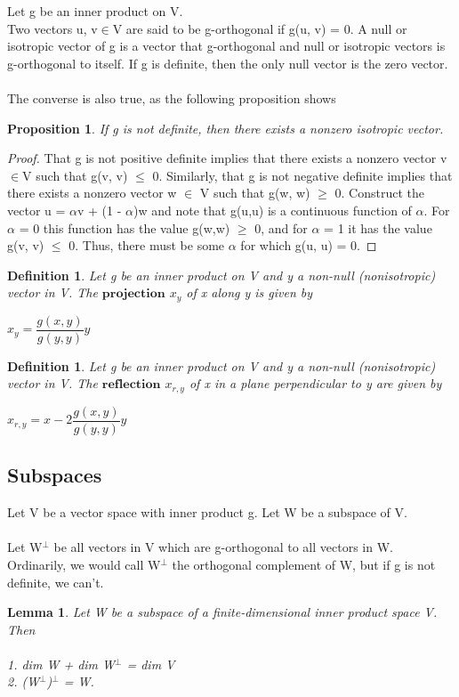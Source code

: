 \documentclass[12pt,a4paper]{article}
\newtheorem{lem}[thm]{Lemma}
\newtheorem{defn}[thm]{Definition}
\newtheorem{prop}{Proposition}
\begin{document}
Let g be an inner product on V. \\
Two vectors u, v$\in$V are said to be
g-orthogonal if g(u, v) = 0. A null or isotropic vector of g is a vector that
g-orthogonal and null or
isotropic vectors
is g-orthogonal to itself. If g is definite, then the only null vector is the zero
vector. \\\\The converse is also true, as the following proposition shows

\begin{prop}
If g is not definite, then there exists a nonzero
isotropic vector.
\end{prop}
\begin{proof}
That g is not positive definite implies that there exists a nonzero vector v$\in$V such that g(v, v) $\leq$ 0. Similarly, that g is not negative definite
implies that there exists a nonzero vector w $\in$ V such that g(w, w) $\geq$ 0. Construct the vector u = $\alpha$v + (1 - $\alpha$)w and note that g(u,u) is a continuous function of $\alpha$. For $\alpha$ = 0 this function has the value g(w,w) $\geq$ 0, and for $\alpha$ = 1 it has the value g(v, v) $\leq$ 0. Thus, there must be some $\alpha$ for which g(u, u) = 0.
\end{proof}
\begin{defn}
Let g be an inner product on V and y a non-null (nonisotropic) vector in V. The $\textbf{projection}$ $x_y$ of x along y is given by 
\begin{center}
$x_y = \dfrac{g(x,y)}{g(y,y)} y$
\end{center}
\end{defn}
\begin{defn}
Let g be an inner product on V and y a non-null (nonisotropic) vector in V. The $\textbf{reflection}$ $x_{r,y}$ of x in a plane perpendicular to y are given by 
\begin{center}
$x_{r,y} = x - 2 \dfrac{g(x,y)}{g(y,y)} y$
\end{center}
\end{defn}

\subsection{Subspaces}
Let V be a vector space with inner product g. Let W be a subspace of V.\\\\
Let W$^\perp$ be all vectors in V which are g-orthogonal to all vectors in W.
Ordinarily, we would call W$^\perp$ the orthogonal complement of W, but if g
is not definite, we can’t.
\begin{lem}
Let W be a subspace of a finite-dimensional inner product
space V. Then\\\\
1. dim W + dim W$^\perp$ = dim V\\
2. (W$^\perp$)$^\perp$ = W.
\end{lem}
\end{document}

